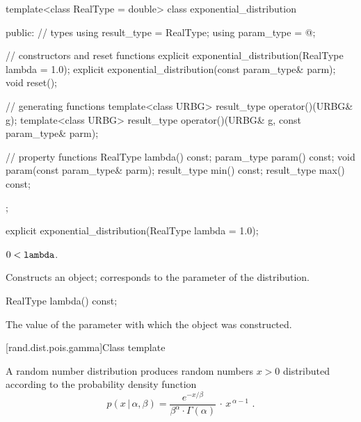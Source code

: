 %
\begin{codeblock}
template<class RealType = double>
  class exponential_distribution {
  public:
    // types
    using result_type = RealType;
    using param_type  = @\unspec@;

    // constructors and reset functions
    explicit exponential_distribution(RealType lambda = 1.0);
    explicit exponential_distribution(const param_type& parm);
    void reset();

    // generating functions
    template<class URBG>
      result_type operator()(URBG& g);
    template<class URBG>
      result_type operator()(URBG& g, const param_type& parm);

    // property functions
    RealType lambda() const;
    param_type param() const;
    void param(const param_type& parm);
    result_type min() const;
    result_type max() const;
  };
\end{codeblock}


%
\begin{itemdecl}
explicit exponential_distribution(RealType lambda = 1.0);
\end{itemdecl}

\begin{itemdescr}
\pnum
\requires $0 < \texttt{lambda}$.

\pnum
\effects Constructs an  object;
 corresponds to the parameter of the distribution.
\end{itemdescr}

%
\begin{itemdecl}
RealType lambda() const;
\end{itemdecl}

\begin{itemdescr}
\pnum\returns The value of the  parameter
 with which the object was constructed.
\end{itemdescr}


[rand.dist.pois.gamma]{Class template }%
%
%

\pnum
A  random number distribution
produces random numbers $x > 0$
distributed according to
the probability density function%
%
%
\[ p(x\,|\,\alpha,\beta) =
     \frac{e^{-x/\beta}}{\beta^{\alpha} \cdot \Gamma(\alpha)} \, \cdot \, x^{\, \alpha-1}
     \text{ .} \]

